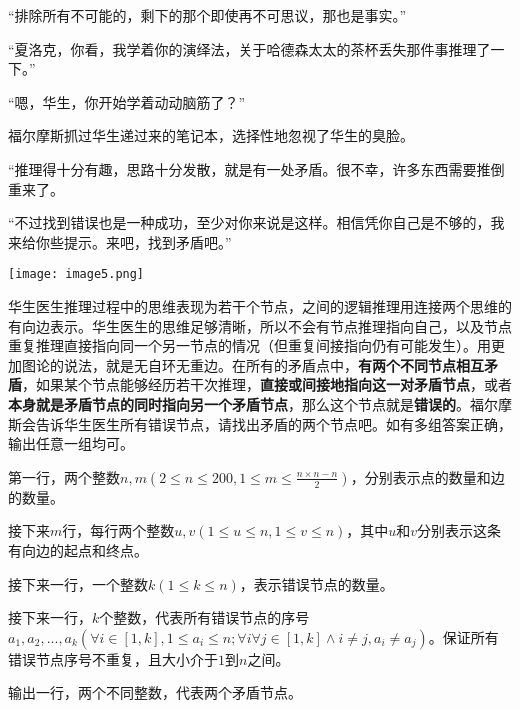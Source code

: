 
“排除所有不可能的，剩下的那个即使再不可思议，那也是事实。”
 
“夏洛克，你看，我学着你的演绎法，关于哈德森太太的茶杯丢失那件事推理了一下。”

“嗯，华生，你开始学着动动脑筋了？”

福尔摩斯抓过华生递过来的笔记本，选择性地忽视了华生的臭脸。

“推理得十分有趣，思路十分发散，就是有一处矛盾。很不幸，许多东西需要推倒重来了。

“不过找到错误也是一种成功，至少对你来说是这样。相信凭你自己是不够的，我来给你些提示。来吧，找到矛盾吧。”

\texttt{[image: image5.png]}

华生医生推理过程中的思维表现为若干个节点，之间的逻辑推理用连接两个思维的有向边表示。华生医生的思维足够清晰，所以不会有节点推理指向自己，以及节点重复推理直接指向同一个另一节点的情况（但重复间接指向仍有可能发生）。用更加图论的说法，就是无自环无重边。在所有的矛盾点中，\textbf{有两个不同节点相互矛盾}，如果某个节点能够经历若干次推理，\textbf{直接或间接地指向这一对矛盾节点}，或者\textbf{本身就是矛盾节点的同时指向另一个矛盾节点}，那么这个节点就是\textbf{错误的}。福尔摩斯会告诉华生医生所有错误节点，请找出矛盾的两个节点吧。如有多组答案正确，输出任意一组均可。


第一行，两个整数$n,m(2\leqslant n\leqslant 200,1\leqslant m\leqslant \frac{n\times n-n}{2})$，分别表示点的数量和边的数量。

接下来$m$行，每行两个整数$u,v(1\leqslant u\leqslant n,1\leqslant v\leqslant n)$，其中$u$和$v$分别表示这条有向边的起点和终点。

接下来一行，一个整数$k(1\leqslant k\leqslant n)$，表示错误节点的数量。

接下来一行，$k$个整数，代表所有错误节点的序号$a_1,a_2,...,a_k(\forall i\in [1,k],1\leqslant a_i\leqslant n;\forall i\forall j\in [1,k]\land i\neq j,a_i\neq a_j)$。保证所有错误节点序号不重复，且大小介于$1$到$n$之间。


输出一行，两个不同整数，代表两个矛盾节点。


